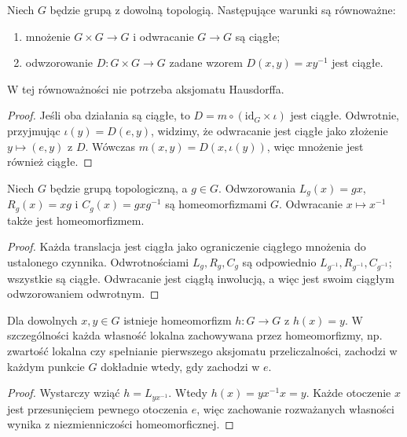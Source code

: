 \begin{twierdzenie}
\label{thm:topog24-difference}
Niech \(G\) będzie grupą z dowolną topologią.
Następujące warunki są równoważne:
\begin{enumerate}[label=\textup{(\roman*)}]
\item mnożenie \(G\times G\to G\) i odwracanie
      \(G\to G\) są ciągłe;
\item odwzorowanie \(D\colon G\times G\to G\)
      zadane wzorem \(D(x,y)=xy^{-1}\) jest ciągłe.
\end{enumerate}
W tej równoważności nie potrzeba aksjomatu Hausdorffa.
\end{twierdzenie}
\begin{proof}
Jeśli oba działania są ciągłe, to
\(D=m\circ(\mathrm{id}_G\times\iota)\)
jest ciągłe. Odwrotnie, przyjmując
\(\iota(y)=D(e,y)\), widzimy, że odwracanie
jest ciągłe jako złożenie \(y\mapsto(e,y)\)
z \(D\). Wówczas
\(m(x,y)=D(x,\iota(y))\),
więc mnożenie jest również ciągłe.
\end{proof}

\begin{stwierdzenie}
\label{prop:topog24-translations}
Niech \(G\) będzie grupą topologiczną,
a \(g\in G\). Odwzorowania
\(L_g(x)=gx\), \(R_g(x)=xg\) i
\(C_g(x)=gxg^{-1}\) są homeomorfizmami \(G\).
Odwracanie \(x\mapsto x^{-1}\) także
jest homeomorfizmem.
\end{stwierdzenie}
\begin{proof}
Każda translacja jest ciągła jako
ograniczenie ciągłego mnożenia do
ustalonego czynnika. Odwrotnościami
\(L_g,R_g,C_g\) są odpowiednio
\(L_{g^{-1}},R_{g^{-1}},C_{g^{-1}}\);
wszystkie są ciągłe. Odwracanie
jest ciągłą inwolucją, a więc
jest swoim ciągłym odwzorowaniem odwrotnym.
\end{proof}

\begin{wniosek}[Jednorodność]
\label{cor:topog24-homogeneous}
Dla dowolnych \(x,y\in G\) istnieje
homeomorfizm \(h\colon G\to G\) z \(h(x)=y\).
W szczególności każda własność lokalna
zachowywana przez homeomorfizmy,
np. zwartość lokalna czy spełnianie
pierwszego aksjomatu przeliczalności,
zachodzi w każdym punkcie \(G\) dokładnie wtedy,
gdy zachodzi w \(e\).
\end{wniosek}
\begin{proof}
Wystarczy wziąć \(h=L_{yx^{-1}}\).
Wtedy \(h(x)=yx^{-1}x=y\).
Każde otoczenie \(x\) jest
przesunięciem pewnego otoczenia \(e\),
więc zachowanie rozważanych własności
wynika z niezmienniczości homeomorficznej.
\end{proof}

